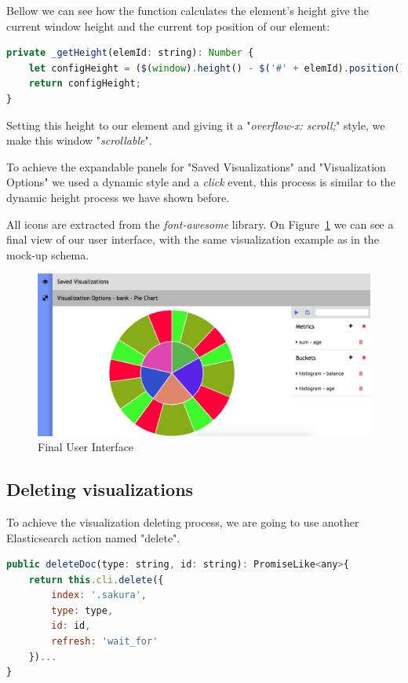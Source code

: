 \documentclass[a4paper, 12pt, english]{book}
\begin{document}
Bellow we can see how the function calculates the element's height give the current window height and the current top position of our element:
\begin{lstlisting}[language=javascript, caption=Dynamic height with Angular, label=code:cutom-pie-chart-obj]
private _getHeight(elemId: string): Number {
	let configHeight = ($(window).height() - $('#' + elemId).position().top);
	return configHeight;
}
\end{lstlisting}

Setting this height to our element and giving it a "\textit{overflow-x: scroll;}" style, we make this window "\textit{scrollable}".

To achieve the expandable panels for "Saved Visualizations" and "Visualization Options" we used a dynamic style and a \textit{click} event, this process is similar to the dynamic height process we have shown before.

All icons are extracted from the \textit{font-awesome} library. On Figure~\ref{fig:final-user-interface} we can see a final view of our user interface, with the same visualization example as in the mock-up schema.
\begin{figure}
  \centering
  \includegraphics[width=15cm, keepaspectratio]{img/final-user-interface.png}
  \caption{Final User Interface}
  \label{fig:final-user-interface}
\end{figure}

\subsection{Deleting visualizations}
\label{sec:deleting-visualizations}
To achieve the visualization deleting process, we are going to use another Elasticsearch action named "delete".
\begin{lstlisting}[language=javascript, caption=Calling the Elasticsearch "delete" action, label=code:elasticsearch-delete]
public deleteDoc(type: string, id: string): PromiseLike<any>{
	return this.cli.delete({
		index: '.sakura',
		type: type,
		id: id,
		refresh: 'wait_for'
	})...
}
\end{lstlisting}
\end{document}
